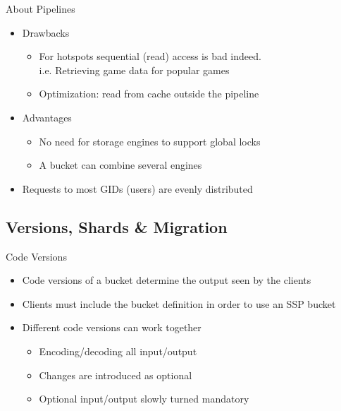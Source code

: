 \documentclass[aspectratio=169]{beamer}
\begin{document}
\begin{frame}{About Pipelines}
    \begin{itemize}
        \item Drawbacks
            \begin{itemize}
                \item For hotspots sequential (read) access is bad indeed.\\
                    i.e. Retrieving game data for popular games
                \item Optimization: read from cache outside the pipeline
            \end{itemize}
        \pause
        \item Advantages
            \begin{itemize}
                \item No need for storage engines to support global locks
                \item A bucket can combine several engines
            \end{itemize}
        \pause
        \item Requests to most GIDs (users) are evenly distributed
    \end{itemize}
\end{frame}

\subsection{Versions, Shards \& Migration}

\begin{frame}{Code Versions}
    \begin{itemize}
        \item Code versions of a bucket determine the output seen by the clients
        \item Clients must include the bucket definition in order to use an SSP bucket
        \item Different code versions can work together
            \begin{itemize}
                \item Encoding/decoding all input/output
                \item Changes are introduced as optional
                \item Optional input/output slowly turned mandatory
            \end{itemize}
    \end{itemize}
\end{frame}
\end{document}
